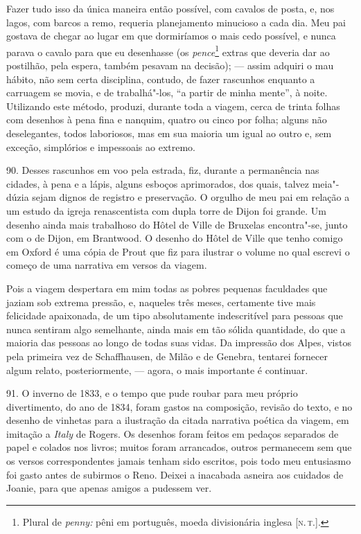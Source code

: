Fazer tudo isso da única maneira então possível, com cavalos de posta,
e, nos lagos, com barcos a remo, requeria planejamento minucioso a cada
dia. Meu pai gostava de chegar ao lugar em que dormiríamos o mais cedo
possível, e nunca parava o cavalo para que eu desenhasse (os
\emph{pence}\footnote{Plural de \emph{penny:} pêni em português, moeda
  divisionária inglesa {[}\textsc{n.\,t.}{]}.} extras que deveria dar ao
postilhão, pela espera, também pesavam na decisão); --- assim adquiri o
mau hábito, não sem certa disciplina, contudo, de fazer rascunhos
enquanto a carruagem se movia, e de trabalhá"-los, ``a partir de minha
mente'', à noite. Utilizando este método, produzi, durante toda a
viagem, cerca de trinta folhas com desenhos à pena fina e nanquim,
quatro ou cinco por folha; alguns não deselegantes, todos laboriosos,
mas em sua maioria um igual ao outro e, sem exceção, simplórios e
impessoais ao extremo.

90. Desses rascunhos em voo pela estrada, fiz, durante a permanência nas
cidades, à pena e a lápis, alguns esboços aprimorados, dos quais, talvez
meia"-dúzia sejam dignos de registro e preservação. O orgulho de meu pai
em relação a um estudo da igreja renascentista com dupla torre de Dijon
foi grande. Um desenho ainda mais trabalhoso do Hôtel de Ville de
Bruxelas encontra"-se, junto com o de Dijon, em Brantwood. O desenho do
Hôtel de Ville que tenho comigo em Oxford é uma cópia de Prout que fiz
para ilustrar o volume no qual escrevi o começo de uma narrativa em
versos da viagem.

Pois a viagem despertara em mim todas as pobres pequenas faculdades que
jaziam sob extrema pressão, e, naqueles três meses, certamente tive mais
felicidade apaixonada, de um tipo absolutamente indescritível para
pessoas que nunca sentiram algo semelhante, ainda mais em tão sólida
quantidade, do que a maioria das pessoas ao longo de todas suas vidas.
Da impressão dos Alpes, vistos pela primeira vez de Schaffhausen, de
Milão e de Genebra, tentarei fornecer algum relato, posteriormente, ---
agora, o mais importante é continuar.

91. O inverno de 1833, e o tempo que pude roubar para meu próprio
divertimento, do ano de 1834, foram gastos na composição, revisão do
texto, e no desenho de vinhetas para a ilustração da citada narrativa
poética da viagem, em imitação a \emph{Italy} de Rogers. Os desenhos
foram feitos em pedaços separados de papel e colados nos livros; muitos
foram arrancados, outros permanecem sem que os versos correspondentes
jamais tenham sido escritos, pois todo meu entusiasmo foi gasto antes de
subirmos o Reno. Deixei a inacabada asneira aos cuidados de Joanie, para
que apenas amigos a pudessem ver.

